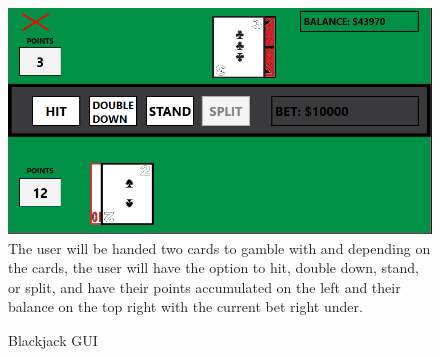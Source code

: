 \documentclass[10pt,conference,onecolumn,compsoc]{IEEEtran}
\begin{document}
\newpage

\begin{figure}[h]
\caption{Blackjack GUI}
\includegraphics[scale=0.7]{Black_jack}
\label{fig:blackjack}
\centering
\newline The user will be handed two cards to gamble with and depending on the cards, the user will have the option to hit, double down, stand, or split, and have their points accumulated on the left and their balance on the top right with the current bet right under.
\end{figure}

\newpage
\end{document}
